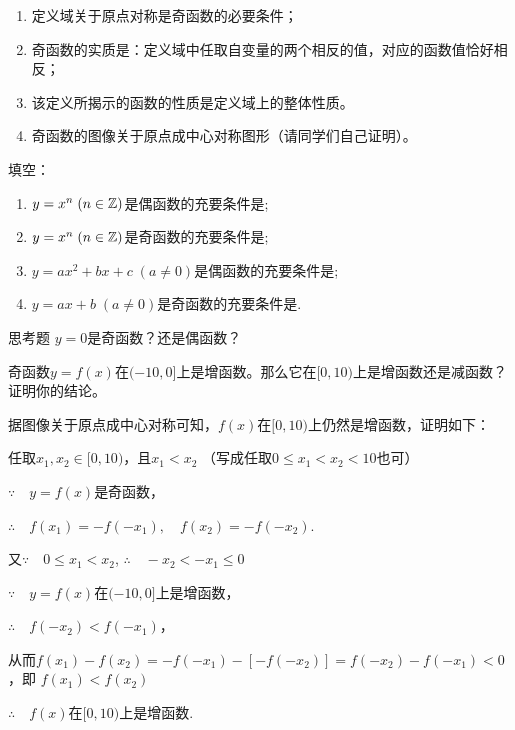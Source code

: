 \begin{note}
\begin{enumerate}
    \item 定义域关于原点对称是奇函数的必要条件；
    \item 奇函数的实质是：定义域中任取自变量的两个相反的值，对应的函数值恰好相反；
    \item 该定义所揭示的函数的性质是定义域上的整体性质。
    \item 奇函数的图像关于原点成中心对称图形（请同学们自己证明）。
\end{enumerate}
\end{note}

\begin{ex}
填空：
\begin{enumerate}[(1)]
    \item $y=x^n\; (n\in\mathbb{Z})$是偶函数的充要条件是\blank;
    \item $y=x^n\; (n\in\mathbb{Z})$是奇函数的充要条件是\blank;
    \item $y=ax^2+bx+c\; (a\ne 0)$是偶函数的充要条件是\blank;
    \item $y=ax+b\; (a\ne 0)$是奇函数的充要条件是\blank.
\end{enumerate}
\end{ex}

\begin{thm}{思考题}
    $y=0$是奇函数？还是偶函数？    
\end{thm}

\begin{example}
    奇函数$y=f(x)$在$(-10,0]$上是增函数。那么它在$[0,10)$上是增函数还是减函数？证明你的结论。
\end{example}

\begin{solution}
据图像关于原点成中心对称可知，$f(x)$在$[0,10)$上仍然是增函数，证明如下：

任取$x_1,x_2\in [0,10)$，且$x_1<x_2$ （写成任取$0\le x_1<x_2<10$也可）

$\because\quad y=f(x)$是奇函数，

$\therefore\quad f(x_1)=-f(-x_1),\quad f(x_2)=-f(-x_2)$.

又$\because\quad 0\le x_1<x_2$, $\therefore\quad -x_2<-x_1\le 0$

$\because\quad y=f(x)$在$(-10,0]$上是增函数，

$\therefore\quad f(-x_2)<f(-x_1)$，

从而$f(x_1)-f(x_2)=-f(-x_1)-[-f(-x_2)]=f(-x_2)-f(-x_1)<0$，即
$f(x_1)<f(x_2)$

$\therefore\quad f(x)$在$[0,10)$上是增函数.
\end{solution}

